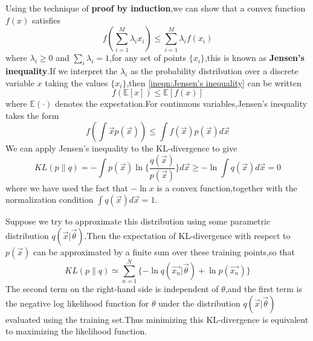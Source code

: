 Using the technique of \textbf{proof by induction},we can show that a convex function $f(x)$ satisfies 
\begin{equation}\label{ineqn:Jensen's inequality}
f(\sum_{i=1}^{M}\lambda_i x_i) \leq \sum_{i=1}^{M}\lambda_i f(x_i)
\end{equation}
where $\lambda_i \geq 0$ and $\sum_{i}\lambda_i = 1$,for any set of points $\{x_i\}$,this is known as \textbf{Jensen's inequality}.If we interpret the $\lambda_i$ as the probability distribution over a discrete variable $x$ taking the values $\{x_i\}$,then \ref{ineqn:Jensen's inequality} can be written
\begin{equation}
f(\mathbb{E}[x]) \leq \mathbb{E}[f(x)]
\end{equation}
where $\mathbb{E}(\cdot)$ denotes the expectation.For continuous variables,Jensen's inequality takes the form
\begin{equation}
f(\int \vec{x}p(\vec{x})) \leq \int f(\vec{x})p(\vec{x})d\vec{x}
\end{equation}
We can apply Jensen's inequality to the KL-divergence to give
\begin{equation}
KL(p\parallel q) = -\int p(\vec{x}) \ln\{\dfrac{q(\vec{x})}{p(\vec{x})}\}d\vec{x} \geq -\ln \int q(\vec{x})d\vec{x} = 0
\end{equation}
where we have used the fact that $-\ln x$ is a convex function,together with the normalization condition $\int q(\vec{x})d\vec{x} = 1$.

Suppose we try to approximate this distribution using some parametric distribution $q(\vec{x}|\vec{\theta})$.Then the expectation of KL-divergence with respect to $p(\vec{x})$ can be approximated by a finite sum over these training points,so that
\begin{equation}
KL(p\parallel q) \simeq \sum_{n=1}^{N}\{-\ln q(\vec{x_n}|\vec{\theta}) + \ln p(\vec{x_n})\}
\end{equation}
The second term on the right-hand side is independent of $\theta$,and the first term is the negative log likelihood function for $\theta$ under the distribution $q(\vec{x}|\vec{\theta})$ evaluated using the training set.Thus minimizing this KL-divergence is equivalent to maximizing the likelihood function.


